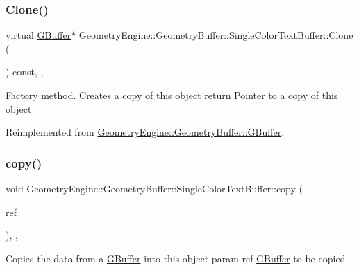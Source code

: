 \subsubsection{\texorpdfstring{Clone()}{Clone()}}
{\footnotesize\ttfamily virtual \mbox{\hyperlink{class_geometry_engine_1_1_geometry_buffer_1_1_g_buffer}{G\+Buffer}}$\ast$ Geometry\+Engine\+::\+Geometry\+Buffer\+::\+Single\+Color\+Text\+Buffer\+::\+Clone (\begin{DoxyParamCaption}{ }\end{DoxyParamCaption}) const\hspace{0.3cm}{\ttfamily [inline]}, {\ttfamily [override]}, {\ttfamily [virtual]}}

Factory method. Creates a copy of this object return Pointer to a copy of this object 

Reimplemented from \mbox{\hyperlink{class_geometry_engine_1_1_geometry_buffer_1_1_g_buffer_af993f8c23f7e78051f3071be4873af9d}{Geometry\+Engine\+::\+Geometry\+Buffer\+::\+G\+Buffer}}.

\mbox{\label{class_geometry_engine_1_1_geometry_buffer_1_1_single_color_text_buffer_a6e266272638dd67cec7b6d57f172eae2}} 
\subsubsection{\texorpdfstring{copy()}{copy()}}
{\footnotesize\ttfamily void Geometry\+Engine\+::\+Geometry\+Buffer\+::\+Single\+Color\+Text\+Buffer\+::copy (\begin{DoxyParamCaption}\item[{const \mbox{\hyperlink{class_geometry_engine_1_1_geometry_buffer_1_1_g_buffer}{G\+Buffer}} \&}]{ref }\end{DoxyParamCaption})\hspace{0.3cm}{\ttfamily [override]}, {\ttfamily [protected]}, {\ttfamily [virtual]}}

Copies the data from a \mbox{\hyperlink{class_geometry_engine_1_1_geometry_buffer_1_1_g_buffer}{G\+Buffer}} into this object param ref \mbox{\hyperlink{class_geometry_engine_1_1_geometry_buffer_1_1_g_buffer}{G\+Buffer}} to be copied 

